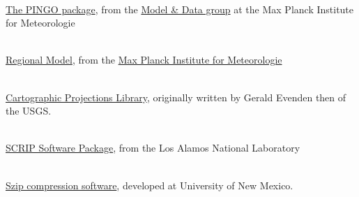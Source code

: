 \begin{thebibliography}{xx}
\label{PINGO}
 \ \\
  \href{http://www.mad.zmaw.de/Pingo/post/down/BigPingo.pdf}{The PINGO package},
  from the
  \href{http://www.mad.zmaw.de}{Model \& Data group}
  at the Max Planck Institute for Meteorologie

\label{REMO}
 \ \\
  \href{http://www.mpimet.mpg.de/en/wissenschaft/ueberblick/atmosphaere-im-erdsystem/regionale-klimamodellierung.html}
       {Regional Model},
  from the
  \href{http://www.mpimet.mpg.de}
       {Max Planck Institute for Meteorologie}

\label{PROJ.4}
 \ \\
  \href{http://trac.osgeo.org/proj/}{Cartographic Projections Library},
  originally written by Gerald Evenden then of the USGS.

\label{SCRIP}
 \ \\
  \href{http://climate.lanl.gov/Software/SCRIP}{SCRIP Software Package},
  from the Los Alamos National Laboratory

\label{szip}
 \ \\
  \href{http://www.hdfgroup.org/doc_resource/SZIP}{Szip compression software},
  developed at University of New Mexico.

\end{thebibliography}
